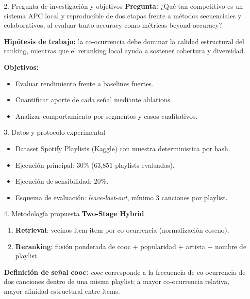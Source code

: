 \documentclass[final]{beamer}
\newlength{\colwidth}
\begin{document}
\begin{frame}[t]
\begin{columns}[t]
\begin{column}{\colwidth}
\begin{alertblock}{2. Pregunta de investigación y objetivos}
\textbf{Pregunta:} ¿Qué tan competitivo es un sistema APC local y reproducible de dos etapas frente a métodos secuenciales y colaborativos, al evaluar tanto accuracy como métricas beyond-accuracy?

\vspace{0.15cm}
\textbf{Hipótesis de trabajo:} la co-ocurrencia debe dominar la calidad estructural del ranking, mientras que el reranking local ayuda a sostener cobertura y diversidad.

\vspace{0.25cm}
\textbf{Objetivos:}
\begin{itemize}
  \item Evaluar rendimiento frente a baselines fuertes.
  \item Cuantificar aporte de cada señal mediante ablations.
  \item Analizar comportamiento por segmentos y casos cualitativos.
\end{itemize}
\end{alertblock}

\begin{block}{3. Datos y protocolo experimental}
\begin{itemize}
  \item Dataset Spotify Playlists (Kaggle) con muestra deterministica por hash.
  \item Ejecución principal: 30\% (63,851 playlists evaluadas).
  \item Ejecución de sensibilidad: 20\%.
  \item Esquema de evaluación: \textit{leave-last-out}, mínimo 3 canciones por playlist.
\end{itemize}
\end{block}

\begin{block}{4. Metodología propuesta}
\textbf{Two-Stage Hybrid}
\begin{enumerate}
  \item \textbf{Retrieval}: vecinos item-item por co-ocurrencia (normalización coseno).
  \item \textbf{Reranking}: fusión ponderada de cooc + popularidad + artista + nombre de playlist.
\end{enumerate}

\textbf{Definición de señal cooc:} \textit{cooc} corresponde a la frecuencia de co-ocurrencia de dos canciones dentro de una misma playlist; a mayor co-ocurrencia relativa, mayor afinidad estructural entre ítems.


\end{block}
\end{column}
\end{columns}
\end{frame}
\end{document}
